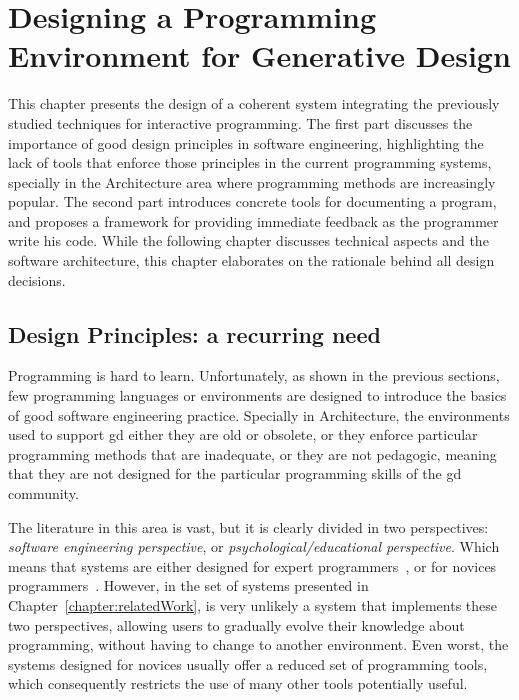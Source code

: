 \chapter{Designing a Programming Environment for Generative Design}
\label{chapter:pegd}

This chapter presents the design of a coherent system integrating the previously studied techniques for interactive programming. The first part discusses the importance of good design principles in software engineering, highlighting the lack of tools that enforce those principles in the current programming systems, specially in the Architecture area where programming methods are increasingly popular. The second part introduces concrete tools for documenting a program, and proposes a framework for providing immediate feedback as the programmer write his code. While the following chapter discusses technical aspects and the software architecture, this chapter elaborates on the rationale behind all design decisions.

\section{Design Principles: a recurring need} 

Programming is hard to learn. Unfortunately, as shown in the previous sections, few programming languages or environments are designed to introduce the basics of good software engineering practice. Specially in Architecture, the environments used to support \gls{gd} either they are old or obsolete, or they enforce particular programming methods that are inadequate, or they are not pedagogic, meaning that they are not designed for the particular programming skills of the \gls{gd} community.

The literature in this area is vast, but it is clearly divided in two perspectives: \textit{software engineering perspective}, or \textit{psychological/educational perspective}. Which means that systems are either designed for expert programmers~\citep{carlson2005eclipse,intellij2001intellij,lighttable,boudreau2002netbeans,guckenheimer2006software}, or for novices programmers~\citep{papert1980mindstorms,goldberg1983smalltalk,GuoSIGCSE2013,Reas2006}. However, in the set of systems presented in Chapter~\ref{chapter:relatedWork}, is very unlikely a system that implements these two perspectives, allowing users to gradually evolve their knowledge about programming, without having to change to another environment. Even worst, the systems designed for novices usually offer a reduced set of programming tools, which consequently restricts the use of many other tools potentially useful. 

